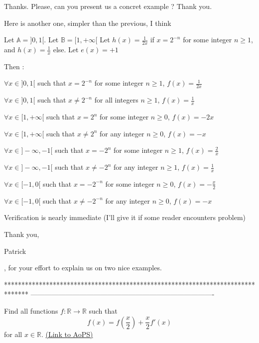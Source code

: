 \begin{solution}
	\begin{tcolorbox}Thanks. Please, can you present us a concret example ? Thank you.\end{tcolorbox}

Here is another one, simpler than the previous, I think

Let $ \mathbb{A}=]0,1[$.
Let $ \mathbb{B}=[1,+\infty[$
Let $ h(x)=\frac{1}{2x}$ if $ x=2^{-n}$ for some integer $ n\geq 1$, and $ h(x)=\frac{1}{x}$ else.
Let $ e(x)=+1$

Then :

$ \forall x\in]0,1[$ such that $ x=2^{-n}$ for some integer $ n\geq 1$, $ f(x)=\frac{1}{2x}$

$ \forall x\in]0,1[$ such that $ x\neq 2^{-n}$ for all integers $ n\geq 1$, $ f(x)=\frac{1}{x}$

$ \forall x\in[1,+\infty[$ such that $ x=2^n$ for some integer $ n\geq 0$, $ f(x)=-2x$

$ \forall x\in[1,+\infty[$ such that $ x\neq 2^n$ for any integer $ n\geq 0$, $ f(x)=-x$

$ \forall x\in]-\infty,-1[$ such that $ x=-2^n$ for some integer $ n\geq 1$, $ f(x)=\frac{2}{x}$

$ \forall x\in]-\infty,-1[$ such that $ x\neq -2^n$ for any integer $ n\geq 1$, $ f(x)=\frac{1}{x}$

$ \forall x\in[-1,0[$ such that $ x=-2^{-n}$ for some integer $ n\geq 0$, $ f(x)=-\frac{x}{2}$

$ \forall x\in[-1,0[$ such that $ x\neq -2^{-n}$ for any integer $ n\geq 0$, $ f(x)=-x$

Verification is nearly immediate (I'll give it if some reader encounters problem)
\end{solution}



\begin{solution}
	Thank you, \begin{bolded}Patrick\end{bolded}, for your effort to explain us on two nice examples.
\end{solution}
*******************************************************************************
-------------------------------------------------------------------------------

\begin{problem}
	Find all functions $f: \mathbb R \to \mathbb R$ such that
 \[ f(x)=f\left(\frac{x}{2}\right)+\frac{x}{2}f'(x)\]
for all $x \in \mathbb R$.
	\flushright \href{https://artofproblemsolving.com/community/q2h278400}{(Link to AoPS)}
\end{problem}



